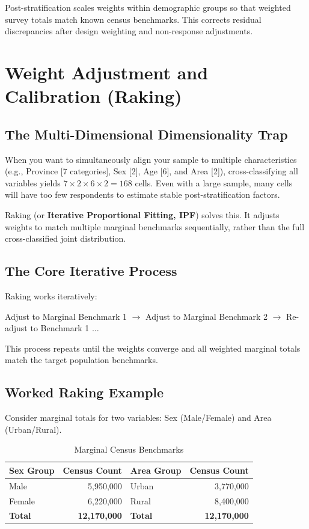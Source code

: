 \documentclass[11pt,a4paper]{article}
\begin{document}
\begin{keytakeaway}
Post-stratification scales weights within demographic groups so that weighted survey totals match known census benchmarks. This corrects residual discrepancies after design weighting and non-response adjustments.
\end{keytakeaway}

\section{Weight Adjustment and Calibration (Raking)}

\subsection{The Multi-Dimensional Dimensionality Trap}
When you want to simultaneously align your sample to multiple characteristics (e.g., Province [7 categories], Sex [2], Age [6], and Area [2]), cross-classifying all variables yields $7 \times 2 \times 6 \times 2 = 168$ cells. Even with a large sample, many cells will have too few respondents to estimate stable post-stratification factors.

Raking (or \textbf{Iterative Proportional Fitting, IPF}) solves this. It adjusts weights to match multiple marginal benchmarks sequentially, rather than the full cross-classified joint distribution.

\subsection{The Core Iterative Process}
Raking works iteratively:
\begin{center}
  \sffamily\small
  Adjust to Marginal Benchmark 1 $\rightarrow$ Adjust to Marginal Benchmark 2 $\rightarrow$ Re-adjust to Benchmark 1 $\dots$
\end{center}
This process repeats until the weights converge and all weighted marginal totals match the target population benchmarks.

\subsection{Worked Raking Example}
Consider marginal totals for two variables: Sex (Male/Female) and Area (Urban/Rural).

\begin{table}[htbp]
  \centering
  \caption{Marginal Census Benchmarks}
  \label{tab:marginal_benchmarks}
  \begin{tabular}{lrlr}
    \toprule
    \textbf{Sex Group} & \textbf{Census Count} & \textbf{Area Group} & \textbf{Census Count} \\
    \midrule
    Male & 5,950,000 & Urban & 3,770,000 \\
    Female & 6,220,000 & Rural & 8,400,000 \\
    \midrule
    \textbf{Total} & \textbf{12,170,000} & \textbf{Total} & \textbf{12,170,000} \\
    \bottomrule
  \end{tabular}
\end{table}
\end{document}
